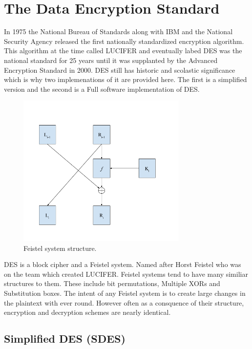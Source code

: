 

\chapter{The Data Encryption Standard}

In 1975 the National Bureau of Standards along with IBM and the National Security Agency released the first nationally standardized encryption algorithm.
This algorithm at the time called LUCIFER and eventually labed DES was the national standard for 25 years until it was supplanted by the Advanced Encryption Standard in 2000.
DES still has historic and scolastic significance which is why two implemenations of it are provided here.
The first is a simplified version and the second is a Full software implementation of DES.

\begin{figure}[ht]
\begin{center}
\includegraphics[width=0.75\textwidth]{./feistel}
\end{center}
\caption{Feistel system structure.}
\end{figure}

DES is a block cipher and a Feistel system. 
Named after Horst Feistel who was on the team which created LUCIFER.
Feistel systems tend to have many similiar structures to them.
These include bit permutations, Multiple XORs and Substitution boxes.
The intent of any Feistel system is to create large changes in the plaintext with ever round.
However often as a consquence of their structure, encryption and decryption schemes are nearly identical.


\section{Simplified DES (SDES) }

